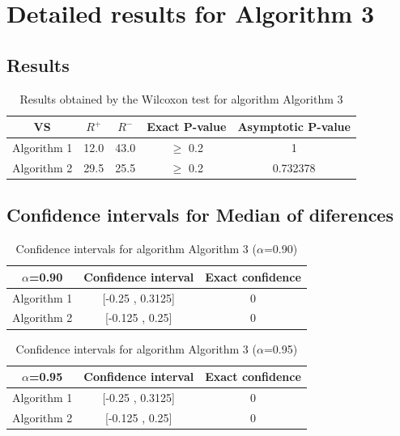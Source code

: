 \documentclass[a4paper,10pt]{article}
\begin{document}
 \clearpage 


\section{Detailed results for Algorithm 3}


\subsection{Results}

\begin{table}[!htp]
\centering\small
\begin{tabular}{
|c|c|c|c|c|}
\hline
 VS & $R^{+}$ & $R^{-}$ & Exact P-value & Asymptotic P-value \\ \hline 
Algorithm 1 & 12.0 & 43.0 & $\geq$ 0.2 & 1\\ \hline 
Algorithm 2 & 29.5 & 25.5 & $\geq$ 0.2 & 0.732378\\ \hline 

\end{tabular}
\caption{Results obtained by the Wilcoxon test for algorithm Algorithm 3}
\end{table}

\subsection{Confidence intervals for Median of diferences}

\begin{table}[!htp]
\centering\small
\begin{tabular}{
|c|c|c|}
\hline
 $\alpha$=0.90 & Confidence interval & Exact confidence \\ \hline 
Algorithm 1 & [-0.25 , 0.3125] & 0\\ \hline 
Algorithm 2 & [-0.125 , 0.25] & 0\\ \hline 

\end{tabular}
\caption{Confidence intervals for algorithm Algorithm 3 ($\alpha$=0.90)}
\end{table}
\begin{table}[!htp]
\centering\small
\begin{tabular}{
|c|c|c|}
\hline
 $\alpha$=0.95 & Confidence interval & Exact confidence \\ \hline 
Algorithm 1 & [-0.25 , 0.3125] & 0\\ \hline 
Algorithm 2 & [-0.125 , 0.25] & 0\\ \hline 

\end{tabular}
\caption{Confidence intervals for algorithm Algorithm 3 ($\alpha$=0.95)}
\end{table}

 \clearpage 
\end{document}
